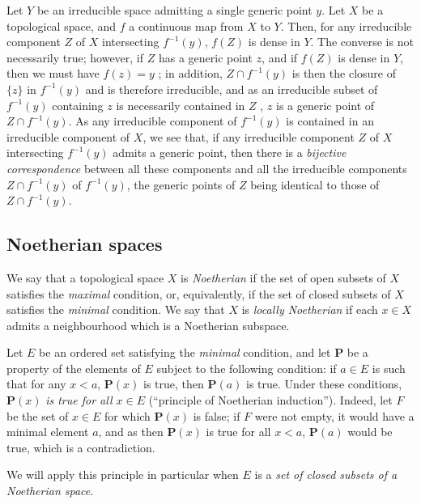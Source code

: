 \begin{env}[2.1.8]
\label{0.2.1.8}
Let $Y$ be an irreducible space admitting a single generic point $y$.
Let $X$ be a topological space, and $f$ a continuous map from $X$ to $Y$.
Then, for any irreducible component $Z$ of $X$ intersecting $f^{-1}(y)$, $f(Z)$ is dense in $Y$.
The converse is not necessarily true; however, if $Z$ has a generic point $z$, and if $f(Z)$ is dense in $Y$, then we must have $f(z)=y$ ; in addition, $Z\cap f^{-1}(y)$ is then the closure of $\{z\}$ in $f^{-1}(y)$ and is therefore irreducible, and as an irreducible subset of $f^{-1}(y)$ containing $z$ is necessarily contained in $Z$ , $z$ is a generic point of $Z\cap f^{-1}(y)$.
As any irreducible component of $f^{-1}(y)$ is contained in an irreducible component of $X$, we see that, if any irreducible component $Z$ of $X$ intersecting $f^{-1}(y)$ admits a generic point, then there is a \emph{bijective correspondence} between all these components and all the irreducible components $Z\cap f^{-1}(y)$ of $f^{-1}(y)$, the generic points of $Z$ being identical to those of $Z\cap f^{-1}(y)$.
\end{env}

\subsection{Noetherian spaces}
\label{subsection:0.2.2}

\begin{env}[2.2.1]
\label{0.2.2.1}
We say that a topological space $X$ is \emph{Noetherian} if the set of open subsets of $X$ satisfies the \emph{maximal} condition, or, equivalently, if the set of closed subsets of $X$ satisfies the \emph{minimal} condition.
We say that $X$ is \emph{locally Noetherian} if each $x\in X$ admits a neighbourhood which is a Noetherian subspace.
\end{env}

\begin{env}[2.2.2]
\label{0.2.2.2}
Let $E$ be an ordered set satisfying the \emph{minimal} condition, and let $\mathbf{P}$ be a property of the elements of $E$ subject to the following condition: if $a\in E$ is such that for any $x<a$, $\mathbf{P}(x)$ is true, then $\mathbf{P}(a)$ is true.
Under these conditions, $\mathbf{P}(x)$ \emph{is true for all $x\in E$} (``principle of Noetherian induction'').
Indeed, let $F$ be the set of $x\in E$ for which $\mathbf{P}(x)$ is false; if $F$ were not empty, it would have a minimal element $a$, and as then $\mathbf{P}(x)$ is true for all $x<a$, $\mathbf{P}(a)$ would be true, which is a contradiction.

We will apply this principle in particular when $E$ is a \emph{set of closed subsets of a Noetherian space}.
\end{env}

